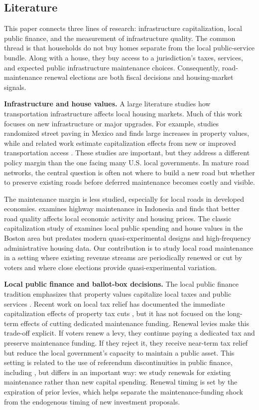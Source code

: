 ﻿\subsection{Literature}  \label{sec:lit_review}

This paper connects three lines of research: infrastructure capitalization, local public finance, and the measurement of infrastructure quality.
The common thread is that households do not buy homes separate from the local public-service bundle. Along with a house, they buy access to a jurisdiction's taxes, services, and expected public infrastructure maintenance choices. Consequently, road-maintenance renewal elections are both fiscal decisions and housing-market signals.

{\bf Infrastructure and house values.} A large literature studies how transportation infrastructure affects local housing markets. Much of this work focuses on new infrastructure or major upgrades. For example, \cite{gonzalez2016paving} studies randomized street paving in Mexico and finds large increases in property values, while \cite{theisen2021road} and related work estimate capitalization effects from new or improved transportation access \citep{dube2018bus}. These studies are important, but they address a different policy margin than the one facing many U.S. local governments. In mature road networks, the central question is often not where to build a new road but whether to preserve existing roads before deferred maintenance becomes costly and visible.

The maintenance margin is less studied, especially for local roads in developed economies. \cite{gertler2024road} examines highway maintenance in Indonesia and finds that better road quality affects local economic activity and housing prices. The classic capitalization study of \cite{edel1974taxes} examines local public spending and house values in the Boston area but predates modern quasi-experimental designs and high-frequency administrative housing data. Our contribution is to study local road maintenance in a setting where existing revenue streams are periodically renewed or cut by voters and where close elections provide quasi-experimental variation.

{\bf Local public finance and ballot-box decisions.} The local public finance tradition emphasizes that property values capitalize local taxes and public services \citep{Oates1969, Oates1972}. Recent work on local tax relief has documented the immediate capitalization effects of property tax cuts \citep{moulton2018benefits}, but it has not focused on the long-term effects of cutting dedicated maintenance funding. Renewal levies make this trade-off explicit. If voters renew a levy, they continue paying a dedicated tax and preserve maintenance funding. If they reject it, they receive near-term tax relief but reduce the local government's capacity to maintain a public asset. This setting is related to the use of referendum discontinuities in public finance, including \cite{cellini2010value}, but differs in an important way: we study renewals for existing maintenance rather than new capital spending. Renewal timing is set by the expiration of prior levies, which helps separate the maintenance-funding shock from the endogenous timing of new investment proposals.

